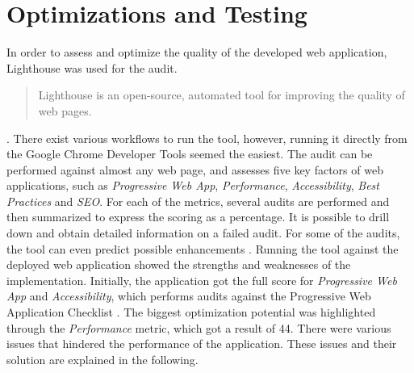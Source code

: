 \section{Optimizations and Testing}
In order to assess and optimize the quality of the developed web application, Lighthouse was used for the audit. \begin{quote}
Lighthouse is an open-source, automated tool for improving the quality of web pages.
\end{quote}. 
There exist various workflows to run the tool, however, running it directly from the Google Chrome Developer Tools seemed the easiest. The audit can be performed against almost any web page, and assesses five key factors of web applications, such as \textit{Progressive Web App}, \textit{Performance}, \textit{Accessibility}, \textit{Best Practices} and \textit{SEO}. For each of the metrics, several audits are performed and then summarized to express the scoring as a percentage. It is possible to drill down and obtain detailed information on a failed audit. For some of the audits, the tool can even predict possible enhancements \cite{lighthouse}.
Running the tool against the deployed web application showed the strengths and weaknesses of the implementation. Initially, the application got the full score for \textit{Progressive Web App} and \textit{Accessibility}, which performs audits against the Progressive Web Application Checklist \cite{pwachecklist}. The biggest optimization potential was highlighted through the \textit{Performance} metric, which got a result of 44. There were various issues that hindered the performance of the application. These issues and their solution are explained in the following.
